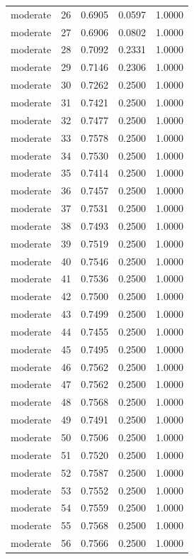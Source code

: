 \begin{tabular}{lrrrr}
moderate & 26 & 0.6905 & 0.0597 & 1.0000 \\
moderate & 27 & 0.6906 & 0.0802 & 1.0000 \\
moderate & 28 & 0.7092 & 0.2331 & 1.0000 \\
moderate & 29 & 0.7146 & 0.2306 & 1.0000 \\
moderate & 30 & 0.7262 & 0.2500 & 1.0000 \\
moderate & 31 & 0.7421 & 0.2500 & 1.0000 \\
moderate & 32 & 0.7477 & 0.2500 & 1.0000 \\
moderate & 33 & 0.7578 & 0.2500 & 1.0000 \\
moderate & 34 & 0.7530 & 0.2500 & 1.0000 \\
moderate & 35 & 0.7414 & 0.2500 & 1.0000 \\
moderate & 36 & 0.7457 & 0.2500 & 1.0000 \\
moderate & 37 & 0.7531 & 0.2500 & 1.0000 \\
moderate & 38 & 0.7493 & 0.2500 & 1.0000 \\
moderate & 39 & 0.7519 & 0.2500 & 1.0000 \\
moderate & 40 & 0.7546 & 0.2500 & 1.0000 \\
moderate & 41 & 0.7536 & 0.2500 & 1.0000 \\
moderate & 42 & 0.7500 & 0.2500 & 1.0000 \\
moderate & 43 & 0.7499 & 0.2500 & 1.0000 \\
moderate & 44 & 0.7455 & 0.2500 & 1.0000 \\
moderate & 45 & 0.7495 & 0.2500 & 1.0000 \\
moderate & 46 & 0.7562 & 0.2500 & 1.0000 \\
moderate & 47 & 0.7562 & 0.2500 & 1.0000 \\
moderate & 48 & 0.7568 & 0.2500 & 1.0000 \\
moderate & 49 & 0.7491 & 0.2500 & 1.0000 \\
moderate & 50 & 0.7506 & 0.2500 & 1.0000 \\
moderate & 51 & 0.7520 & 0.2500 & 1.0000 \\
moderate & 52 & 0.7587 & 0.2500 & 1.0000 \\
moderate & 53 & 0.7552 & 0.2500 & 1.0000 \\
moderate & 54 & 0.7559 & 0.2500 & 1.0000 \\
moderate & 55 & 0.7568 & 0.2500 & 1.0000 \\
moderate & 56 & 0.7566 & 0.2500 & 1.0000 \\

\end{tabular}
